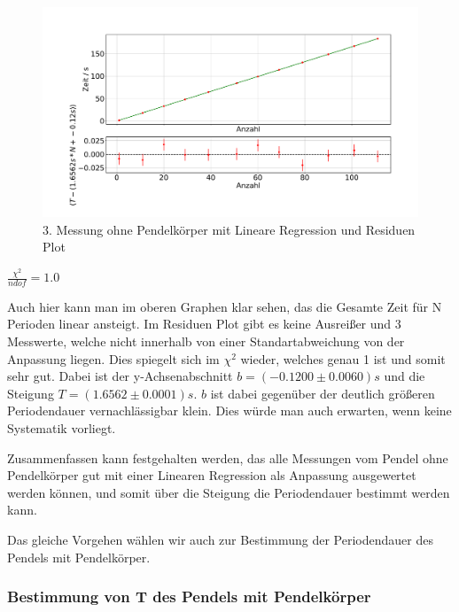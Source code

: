 \documentclass[twoside]{protokoll}
\begin{document}
 
\begin{figure}[H]
    \centering
    \includegraphics[width=1.0\textwidth]{plots/lineare_regression_stange_3.pdf}
    \caption{3. Messung ohne Pendelkörper mit Lineare Regression und Residuen Plot}
\end{figure}
\begin{center}
    $ \frac{\chi^2}{ndof}  =  1.0$
\end{center}
Auch hier kann man im oberen Graphen klar sehen, das die Gesamte Zeit für N Perioden linear ansteigt.
Im Residuen Plot gibt es keine Ausreißer und 3 Messwerte, welche nicht innerhalb von einer Standartabweichung von der Anpassung liegen.
Dies spiegelt sich im $\chi^2$ wieder, welches genau 1 ist und somit sehr gut.
Dabei ist der y-Achsenabschnitt $b =(-0.1200 \pm 0.0060)s$ und die Steigung $T = (1.6562 \pm 0.0001)s$.
$b$ ist dabei gegenüber der deutlich größeren Periodendauer vernachlässigbar klein.
Dies würde man auch erwarten, wenn keine Systematik vorliegt.

Zusammenfassen kann festgehalten werden, das alle Messungen vom Pendel ohne Pendelkörper gut mit einer Linearen Regression als Anpassung ausgewertet werden können, und somit über die Steigung die Periodendauer bestimmt werden kann.

Das gleiche Vorgehen wählen wir auch zur Bestimmung der Periodendauer des Pendels mit Pendelkörper.

\subsubsection{Bestimmung von T des Pendels mit Pendelkörper}
\end{document}
